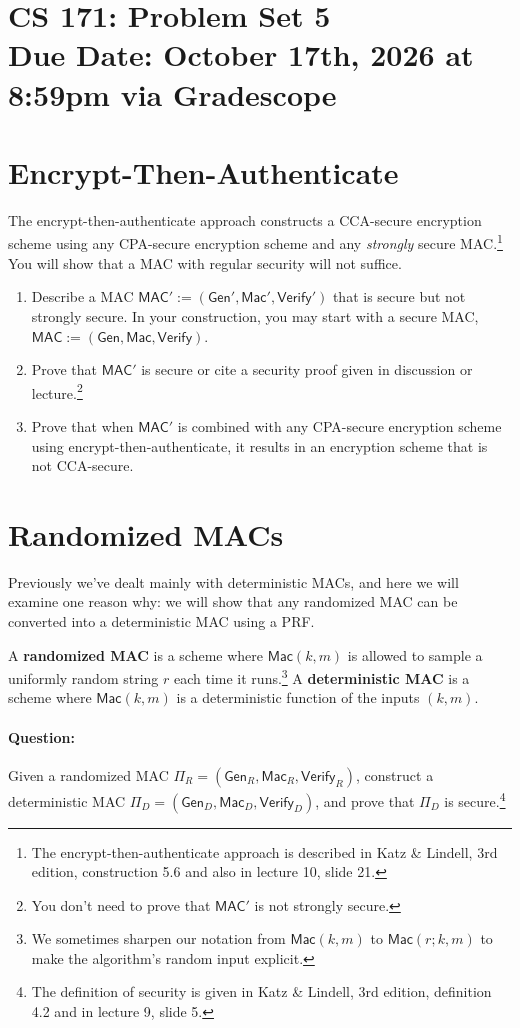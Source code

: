 \documentclass[11pt]{article}
\numberwithin{equation}{section}
\newcommand{\duedate}{October 17th, 2026 at 8:59pm via Gradescope}
\newcommand{\MAC}{\mathsf{MAC}}
\newcommand{\gen}{\mathsf{Gen}}
\newcommand{\mac}{\mathsf{Mac}}
\newcommand{\verify}{\mathsf{Verify}}
\begin{document}
\section*{CS 171: Problem Set 5\\ {\small Due Date: \duedate} }

\section{Encrypt-Then-Authenticate}
The encrypt-then-authenticate approach constructs a CCA-secure encryption scheme using any CPA-secure encryption scheme and any \textit{strongly} secure MAC.\footnote{The encrypt-then-authenticate approach is described in Katz \& Lindell, 3rd edition, construction 5.6 and also in lecture 10, slide 21.} You will show that a MAC with regular security will not suffice.

\begin{enumerate}
    \item Describe a MAC $\MAC' := (\gen', \mac', \verify')$ that is secure but not strongly secure. In your construction, you may start with a secure MAC, $\MAC := (\gen, \mac, \verify)$.
    \item Prove that $\MAC'$ is secure or cite a security proof given in discussion or lecture.\footnote{You don't need to prove that $\MAC'$ is not strongly secure.}
    \item Prove that when $\MAC'$ is combined with any CPA-secure encryption scheme using encrypt-then-authenticate, it results in an encryption scheme that is not CCA-secure.
\end{enumerate}

\pagebreak


\section{Randomized MACs}
Previously we've dealt mainly with deterministic MACs, and here we will examine one reason why: we will show that any randomized MAC can be converted into a deterministic MAC using a PRF.

A \textbf{randomized MAC} is a scheme where $\mac(k,m)$ is allowed to sample a uniformly random string $r$ each time it runs.\footnote{We sometimes sharpen our notation from $\mac(k,m)$ to $\mac(r;k,m)$ to make the algorithm's random input explicit.} A \textbf{deterministic MAC} is a scheme where $\mac(k,m)$ is a deterministic function of the inputs $(k,m)$.

\paragraph{Question:} Given a randomized MAC $\Pi_R = (\gen_R,\allowbreak \mac_R,\allowbreak \verify_R)$, construct a deterministic MAC $\Pi_D = (\gen_D,\allowbreak \mac_D,\allowbreak \verify_D)$, and prove that $\Pi_D$ is secure.\footnote{The definition of security is given in Katz \& Lindell, 3rd edition, definition 4.2 and in lecture 9, slide 5.}
\end{document}

